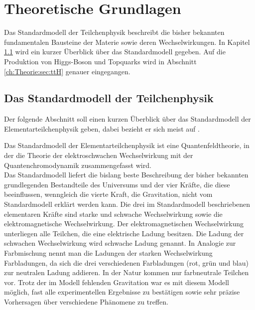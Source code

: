 \chapter{Theoretische Grundlagen}
\label{ch:Theorie}

{}

Das Standardmodell der Teilchenphysik beschreibt die bisher bekannten fundamentalen Bausteine der Materie sowie deren Wechselwirkungen. In Kapitel \ref{ch:Theorie:sec:Standardmodell} wird ein kurzer \"Uberblick \"uber das Standardmodell gegeben. Auf die Produktion von Higgs-Boson und Topquarks wird in Abschnitt \ref{ch:Theorie:sec:ttH} genauer eingegangen.\\


\section{Das Standardmodell der Teilchenphysik}
\label{ch:Theorie:sec:Standardmodell}

Der folgende Abschnitt soll einen kurzen \"Uberblick \"uber das Standardmodell der Elementarteilchenphysik geben, dabei bezieht er sich meist auf \cite{SWB-39819646X}.

Das Standardmodell der Elementarteilchenphysik ist eine Quantenfeldtheorie, in der die Theorie der elektroschwachen Wechselwirkung mit der Quantenchromodynamik zusammengefasst wird.\\%
Das Standardmodell liefert die bislang beste Beschreibung der bisher bekannten grundlegenden Bestandteile des Universums und der vier Kr\"afte, die diese beeinflussen, wenngleich die vierte Kraft, die Gravitation, nicht vom Standardmodell erkl\"art werden kann. Die drei im Standardmodell beschriebenen elementaren Kr\"afte sind starke und schwache Wechselwirkung sowie die elektromagnetische Wechselwirkung. Der elektromagnetischen Wechselwirkung unterliegen alle Teilchen, die eine elektrische Ladung besitzen. Die Ladung der schwachen Wechselwirkung wird schwache Ladung genannt. In Analogie zur Farbmischung nennt man die Ladungen der starken Wechselwirkung Farbladungen, da sich die drei verschiedenen Farbladungen (rot, gr\"un und blau) zur neutralen Ladung addieren. In der Natur kommen nur farbneutrale Teilchen vor. Trotz der im Modell fehlenden Gravitation war es mit diesem Modell m\"oglich, fast alle experimentellen Ergebnisse zu best\"atigen sowie sehr pr\"azise Vorhersagen \"uber verschiedene Ph\"anomene zu treffen.

